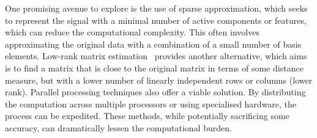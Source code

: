 

One promising avenue to explore is the use of sparse approximation, which seeks to represent the signal with a minimal number of active components or features, which can reduce the computational complexity. This often involves approximating the original data with a combination of a small number of basis elements. Low-rank matrix estimation~\cite{1102314} provides another alternative, which aims is to find a matrix that is close to the original matrix in terms of some distance measure, but with a lower number of linearly independent rows or columns (\ie lower rank). Parallel processing techniques also offer a viable solution. By distributing the computation across multiple processors or using specialised hardware, the process can be expedited. These methods, while potentially sacrificing some accuracy, can dramatically lessen the computational burden. 


